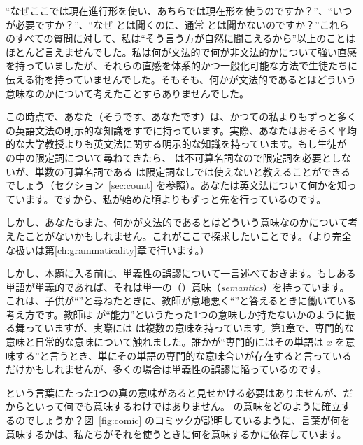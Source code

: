 \enquote{なぜここでは現在進行形を使い、あちらでは現在形を使うのですか？}、\enquote{いつ  が必要ですか？}、\enquote{なぜ  とは聞くのに、通常  とは聞かないのですか？}これらのすべての質問に対して、私は\enquote{そう言う方が自然に聞こえるから}以上のことはほとんど言えませんでした。私は何が文法的で何が非文法的かについて強い直感を持っていましたが、それらの直感を体系的かつ一般化可能な方法で生徒たちに伝える術を持っていませんでした。そもそも、何かが文法的であるとはどういう意味なのかについて考えたことすらありませんでした。

この時点で、あなた（そうです、あなたです）は、かつての私よりもずっと多くの英語文法の明示的な知識をすでに持っています。実際、あなたはおそらく平均的な大学教授よりも英文法に関する明示的な知識を持っています。もし生徒が  の中の限定詞について尋ねてきたら、 は不可算名詞なので限定詞を必要としないが、単数の可算名詞である  は限定詞なしでは使えないと教えることができるでしょう（セクション~\ref{sec:count} を参照）。あなたは英文法について何かを知っています。ですから、私が始めた頃よりもずっと先を行っているのです。

しかし、あなたもまた、何かが文法的であるとはどういう意味なのかについて考えたことがないかもしれません。これがここで探求したいことです。（より完全な扱いは第\ref{ch:grammaticality}章で行います。）

\begin{tblsframed}{} \label{sec:fallacy-of-monosemy}
    しかし、本題に入る前に、単義性の誤謬について一言述べておきます。もしある単語が単義的であれば、それは単一の（）意味（\textit{\emph{sem}antics}）を持っています。これは、子供が\enquote{}と尋ねたときに、教師が意地悪く\enquote{}と答えるときに働いている考え方です。教師は  が\enquote{能力}というたった1つの意味しか持たないかのように振る舞っていますが、実際には  は複数の意味を持っています。第1章で、専門的な意味と日常的な意味について触れました。誰かが\enquote{専門的にはその単語は $x$ を意味する}と言うとき、単にその単語の専門的な意味合いが存在すると言っているだけかもしれませんが、多くの場合は単義性の誤謬に陥っているのです。
\end{tblsframed}\label{sec:monosemy}

 という言葉にたった1つの真の意味があると見せかける必要はありませんが、だからといって何でも意味するわけではありません。 の意味をどのように確立するのでしょうか？図~\ref{fig:comic} のコミックが説明しているように、言葉が何を意味するかは、私たちがそれを使うときに何を意味するかに依存しています。

